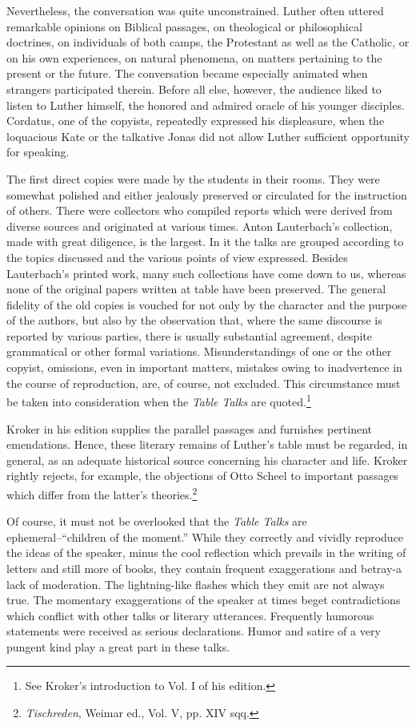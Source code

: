 Nevertheless, the conversation was quite unconstrained. Luther
often uttered remarkable opinions on Biblical passages, on theological
or philosophical doctrines, on individuals of both camps, the Protestant
as well as the Catholic, or on his own experiences, on natural
phenomena, on matters pertaining to the present or the future. The
conversation became especially animated when strangers participated
therein. Before all else, however, the audience liked to listen to Luther
himself, the honored and admired oracle of his younger disciples.
Cordatus, one of the copyists, repeatedly expressed his displeasure,
when the loquacious Kate or the talkative Jonas did not allow Luther
sufficient opportunity for speaking.

The first direct copies were made by the students in their rooms. They
were somewhat polished and either jealously preserved or circulated for the
instruction of others. There were collectors who compiled reports which
were derived from diverse sources and originated at various times. Anton
Lauterbach’s collection, made with great diligence, is the largest. In it the
talks are grouped according to the topics discussed and the various points of
view expressed. Besides Lauterbach’s printed work, many such collections
have come down to us, whereas none of the original papers written at table
have been preserved. The general fidelity of the old copies is vouched for not
only by the character and the purpose of the authors, but also by the observation
that, where the same discourse is reported by various parties, there is
usually substantial agreement, despite grammatical or other formal variations.
Misunderstandings of one or the other copyist, omissions, even in important
matters, mistakes owing to inadvertence in the course of reproduction, are, of
course, not excluded. This circumstance must be taken into consideration
when the \textit{Table Talks} are quoted.\footnote{See Kroker’s introduction to Vol. I of his edition.}


Kroker in his edition supplies the parallel passages and furnishes pertinent
emendations. Hence, these literary remains of Luther’s table must be regarded,
in general, as an adequate historical source concerning his character
and life. Kroker rightly rejects, for example, the objections of Otto
Scheel to important passages which differ from the latter’s theories.\footnote{\textit{Tischreden}, Weimar ed., Vol. V, pp. XIV sqq.}


Of course, it must not be overlooked that the \textit{Table Talks} are
ephemeral--“children of the moment.” While they correctly and
vividly reproduce the ideas of the speaker, minus the cool reflection
which prevails in the writing of letters and still more of books, they
contain frequent exaggerations and betray-a lack of moderation. The
lightning-like flashes which they emit are not always true. The momentary
exaggerations of the speaker at times beget contradictions
which conflict with other talks or literary utterances. Frequently humorous
statements were received as serious declarations. Humor and
satire of a very pungent kind play a great part in these talks.

